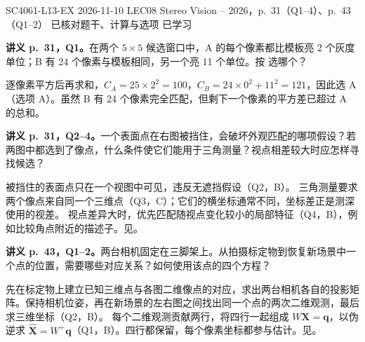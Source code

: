
\examplemeta
  {SC4061-L13-EX}
  {2026-11-10}
  {LEC08 Stereo Vision -- 2026，p.~31（Q1--4）、p.~43（Q1--2）}
  {已核对题干、计算与选项}
  {已学习}

\nopagebreak[4]
\textbf{讲义 p.~31，Q1。}在两个 $5\times5$ 候选窗口中，A 的每个像素都比模板亮 2 个灰度单位；B 有 24 个像素与模板相同，另一个亮 11 个单位。按  选哪个？

\begin{checkedsolution}
逐像素平方后再求和，$C_A=25\times 2^2=100$，$C_B=24\times0^2+11^2=121$，因此选 A（选项 A）。虽然 B 有 24 个像素完全匹配，但剩下一个像素的平方差已超过 A 的总和。
\end{checkedsolution}

\nopagebreak[4]
\textbf{讲义 p.~31，Q2--4。}一个表面点在右图被挡住，会破坏外观匹配的哪项假设？若两图中都选到了像点，什么条件使它们能用于三角测量？视点相差较大时应怎样寻找候选？

\begin{checkedsolution}
被挡住的表面点只在一个视图中可见，违反无遮挡假设（Q2，B）。
三角测量要求两个像点来自同一个三维点（Q3，C）；它们的横坐标通常不同，坐标差正是测深使用的视差。
视点差异大时，优先匹配随视点变化较小的局部特征（Q4，B），例如比较角点附近的描述子。见。
\end{checkedsolution}

\nopagebreak[4]
\textbf{讲义 p.~43，Q1--2。}两台相机固定在三脚架上。从拍摄标定物到恢复新场景中一个点的位置，需要哪些对应关系？如何使用该点的四个方程？

\begin{checkedsolution}
先在标定物上建立已知三维点与各图二维像点的对应，求出两台相机各自的投影矩阵。保持相机位姿，再在新场景的左右图之间找出同一个点的两次二维观测，最后求三维坐标（Q2，B）。
每个二维观测贡献两行，将四行一起组成 $W\bm X=\bm q$，以伪逆求 $\hat{\bm X}=W^+\bm q$（Q1，B）。四行都保留，每个像素坐标都参与估计。见。
\end{checkedsolution}
